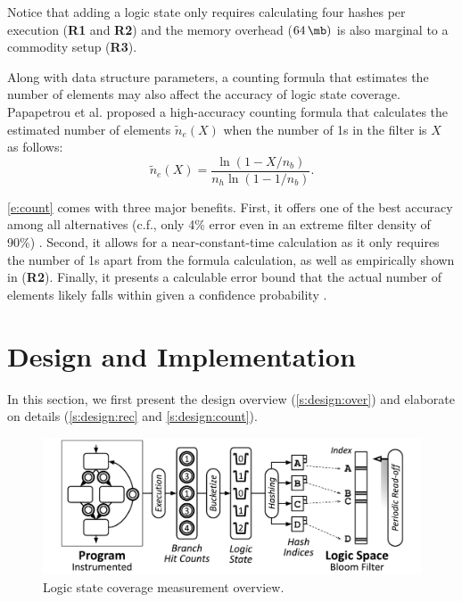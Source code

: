 \documentclass[letterpaper,twocolumn,10pt]{article}
\begin{document}
Notice that adding a logic state only requires calculating four hashes per
execution (\textbf{R1} and \textbf{R2}) and the memory overhead ($\SI{64}{\mb})$
is also marginal to a commodity setup (\textbf{R3}). 


%
Along with data structure parameters, a counting formula that estimates the
number of elements may also affect the accuracy of logic state coverage.
Papapetrou et al. \cite{papapetrou2010cardinality} proposed a high-accuracy
counting formula that calculates the estimated number of elements
$\tilde{n}_e(X)$ when the number of 1s in the filter is $X$ as follows:
%
\begin{equation}
  \tilde{n}_e(X) = \frac{\ln{(1-X/n_b)}}{n_h \ln{(1-1/n_b)}}.
  \label{e:count}
\end{equation}

\autoref{e:count} comes with three major benefits. First, it offers one of the
best accuracy among all alternatives (c.f., only 4\% error even in an extreme
filter density of 90\%)
\cite{harmouch2017cardinality,papapetrou2010cardinality}. 
%
Second, it allows for a near-constant-time calculation as it only requires the
number of 1s apart from the formula calculation, as well as empirically shown in
\cite{harmouch2017cardinality} (\textbf{R2}). 
%
Finally, it presents a calculable error bound that the actual number of elements
likely falls within given a confidence probability \cite{papapetrou2010cardinality}.



\section{Design and Implementation}
\label{s:design}

In this section, we first present the design overview (\autoref{s:design:over})
and elaborate on details (\autoref{s:design:rec} and \ref{s:design:count}).


\begin{figure}[t]
  \centering
  \includegraphics[width=\columnwidth]{images/design.pdf}
  \caption{Logic state coverage measurement overview.}
  \label{f:design}
\end{figure}
\end{document}
